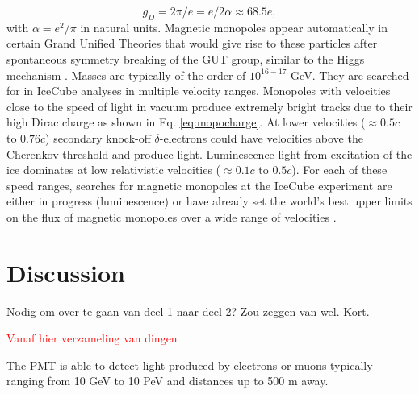 \begin{equation}
\label{eq:mopocharge}
g_D = 2\pi/e = e/2\alpha \approx 68.5e,
\end{equation}
with $\alpha = e^2/\pi$ in natural units. Magnetic monopoles appear automatically in certain Grand Unified Theories that would give rise to these particles after spontaneous symmetry breaking of the GUT group, similar to the Higgs mechanism \cite{HOOFT1974276,Polyakov:1974ek}. Masses are typically of the order of $10^{16-17}$ GeV. They are searched for in IceCube analyses in multiple velocity ranges. Monopoles with velocities close to the speed of light in vacuum produce extremely bright tracks due to their high Dirac charge as shown in Eq. \ref{eq:mopocharge}. At lower velocities ($\approx 0.5c$ to $0.76c$) secondary knock-off $\delta$-electrons could have velocities above the Cherenkov threshold and produce light. Luminescence light from excitation of the ice dominates at low relativistic velocities ($\approx 0.1c$ to $0.5c$). For each of these speed ranges, searches for magnetic monopoles at the IceCube experiment are either in progress (luminescence) or have already set the world's best upper limits on the flux of magnetic monopoles over a wide range of velocities \cite{Aartsen:2014awd}.


\section{Discussion}
Nodig om over te gaan van deel 1 naar deel 2? Zou zeggen van wel. Kort.


\textcolor{red}{Vanaf hier verzameling van dingen}
















The PMT is able to detect light produced by electrons or muons typically ranging from 10 GeV to 10 PeV and distances up to 500 m away. 



